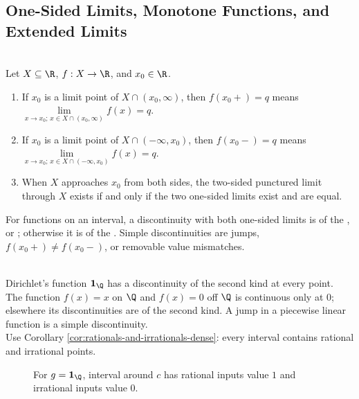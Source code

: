 \subsection{One-Sided Limits, Monotone Functions, and Extended Limits}

\begin{definition} \label{def:one-sided-limits-and-discontinuities} \\
Let $X\subseteq\R$, $f:X\to\R$, and $x_0\in\R$.
\begin{enumerate}[label=(\roman*)]
\setlength{\itemsep}{0pt}
\item If $x_0$ is a limit point of $X\cap(x_0,\infty)$, then $f(x_0+)=q$ means $\lim\limits_{x\to x_0;\,x\in X\cap(x_0,\infty)}f(x)=q$.
\item If $x_0$ is a limit point of $X\cap(-\infty,x_0)$, then $f(x_0-)=q$ means $\lim\limits_{x\to x_0;\,x\in X\cap(-\infty,x_0)}f(x)=q$.
\item When $X$ approaches $x_0$ from both sides, the two-sided punctured limit through $X$ exists if and only if the two one-sided limits exist and are equal.
\end{enumerate}
For functions on an interval, a discontinuity with both one-sided limits is of the , or ; otherwise it is of the . Simple discontinuities are jumps, $f(x_0+)\neq f(x_0-)$, or removable value mismatches.
\end{definition}

\begin{example} \label{ex:basic-discontinuity-types} \\
Dirichlet's function $\mathbf{1}_{\Q}$ has a discontinuity of the second kind at every point.\\
The function $f(x)=x$ on $\Q$ and $f(x)=0$ off $\Q$ is continuous only at $0$; elsewhere its discontinuities are of the second kind. A jump in a piecewise linear function is a simple discontinuity.\\
Use Corollary \ref{cor:rationals-and-irrationals-dense}: every interval contains rational and irrational points.
\end{example}

\begin{figure}[H]
  \centering
  
  \caption{For $g=\mathbf{1}_{\Q}$, interval around $c$ has rational inputs value $1$ and irrational inputs value $0$.}
  \label{fig:dirichlet-dense-rows}
\end{figure}

